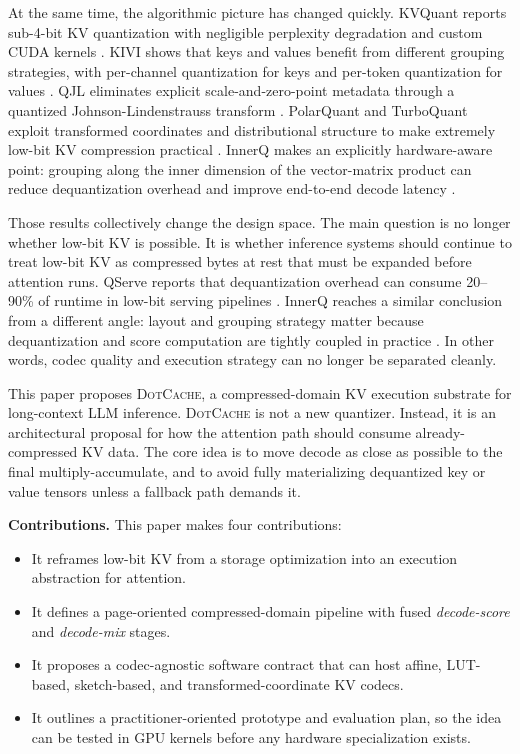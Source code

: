 \documentclass[11pt]{article}
\newcommand{\method}{\textsc{DotCache}}
\newcommand{\kv}{KV}
\begin{document}
At the same time, the algorithmic picture has changed quickly. KVQuant reports sub-4-bit \kv{} quantization with negligible perplexity degradation and custom CUDA kernels \cite{kvquant}. KIVI shows that keys and values benefit from different grouping strategies, with per-channel quantization for keys and per-token quantization for values \cite{kivi}. QJL eliminates explicit scale-and-zero-point metadata through a quantized Johnson-Lindenstrauss transform \cite{qjl}. PolarQuant and TurboQuant exploit transformed coordinates and distributional structure to make extremely low-bit \kv{} compression practical \cite{polarquant,turboquant}. InnerQ makes an explicitly hardware-aware point: grouping along the inner dimension of the vector-matrix product can reduce dequantization overhead and improve end-to-end decode latency \cite{innerq}.

Those results collectively change the design space. The main question is no longer whether low-bit \kv{} is possible. It is whether inference systems should continue to treat low-bit \kv{} as compressed bytes at rest that must be expanded before attention runs. QServe reports that dequantization overhead can consume 20--90\% of runtime in low-bit serving pipelines \cite{qserve}. InnerQ reaches a similar conclusion from a different angle: layout and grouping strategy matter because dequantization and score computation are tightly coupled in practice \cite{innerq}. In other words, codec quality and execution strategy can no longer be separated cleanly.

This paper proposes \method{}, a compressed-domain \kv{} execution substrate for long-context LLM inference. \method{} is not a new quantizer. Instead, it is an architectural proposal for how the attention path should consume already-compressed \kv{} data. The core idea is to move decode as close as possible to the final multiply-accumulate, and to avoid fully materializing dequantized key or value tensors unless a fallback path demands it.

\textbf{Contributions.} This paper makes four contributions:
\begin{itemize}
    \item It reframes low-bit \kv{} from a storage optimization into an execution abstraction for attention.
    \item It defines a page-oriented compressed-domain pipeline with fused \emph{decode-score} and \emph{decode-mix} stages.
    \item It proposes a codec-agnostic software contract that can host affine, LUT-based, sketch-based, and transformed-coordinate \kv{} codecs.
    \item It outlines a practitioner-oriented prototype and evaluation plan, so the idea can be tested in GPU kernels before any hardware specialization exists.
\end{itemize}
\end{document}
